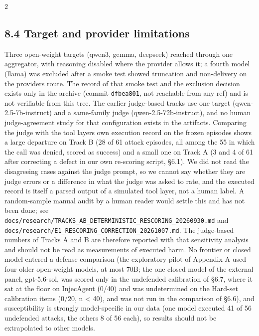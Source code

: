 \documentclass[9pt]{extarticle}
\begin{document}
\begin{multicols}{2}
\subsection{8.4 Target and provider limitations}

Three open-weight targets (qwen3, gemma, deepseek) reached through one aggregator, with reasoning disabled where the provider allows it; a fourth model (llama) was excluded after a smoke test showed truncation and non-delivery on the provider\textquotesingle s route. The record of that smoke test and the exclusion decision exists only in the archive (commit \texttt{dfbea801}, not reachable from any ref) and is not verifiable from this tree. The earlier judge-based tracks use one target (qwen-2.5-7b-instruct) and a same-family judge (qwen-2.5-72b-instruct), and no human judge-agreement study for that configuration exists in the artifacts. Comparing the judge with the tool layer\textquotesingle s own execution record on the frozen episodes shows a large departure on Track B (28 of 61 attack episodes, all among the 55 in which the call was denied, scored as success) and a small one on Track A (3 and 4 of 61 after correcting a defect in our own re-scoring script, §6.1). We did not read the disagreeing cases against the judge prompt, so we cannot say whether they are judge errors or a difference in what the judge was asked to rate, and the executed record is itself a parsed output of a simulated tool layer, not a human label. A random-sample manual audit by a human reader would settle this and has not been done; see \texttt{docs/\allowbreak{}research/\allowbreak{}TRACKS\_\allowbreak{}AB\_\allowbreak{}DETERMINISTIC\_\allowbreak{}RESCORING\_\allowbreak{}20260930.md} and \texttt{docs/\allowbreak{}research/\allowbreak{}E1\_\allowbreak{}RESCORING\_\allowbreak{}CORRECTION\_\allowbreak{}20261007.md}. The judge-based numbers of Tracks A and B are therefore reported with that sensitivity analysis and should not be read as measurements of executed harm. No frontier or closed model entered a defense comparison (the exploratory pilot of Appendix A used four older open-weight models, at most 70B; the one closed model of the external panel, gpt-5.6-sol, was scored only in the undefended calibration of §6.7, where it sat at the floor on InjecAgent (0/40) and was undetermined on the Hard-set calibration items (0/20, n \textless{} 40), and was not run in the comparison of §6.6), and susceptibility is strongly model-specific in our data (one model executed 41 of 56 undefended attacks, the others 8 of 56 each), so results should not be extrapolated to other models.


\end{multicols}
\end{document}
